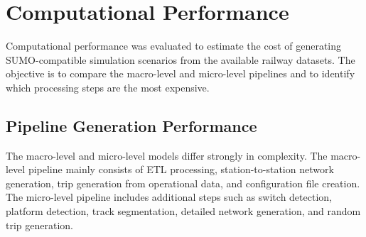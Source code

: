 \section{Computational Performance}
Computational performance was evaluated to estimate the cost of generating SUMO-compatible simulation scenarios from the 
available railway datasets. The objective is to compare the macro-level and micro-level pipelines and to identify which 
processing steps are the most expensive.

\subsection{Pipeline Generation Performance}
The macro-level and micro-level models differ strongly in complexity. The macro-level pipeline mainly consists of ETL 
processing, station-to-station network generation, trip generation from operational data, and configuration file creation. 
The micro-level pipeline includes additional steps such as switch detection, platform detection, track segmentation, 
detailed network generation, and random trip generation.



